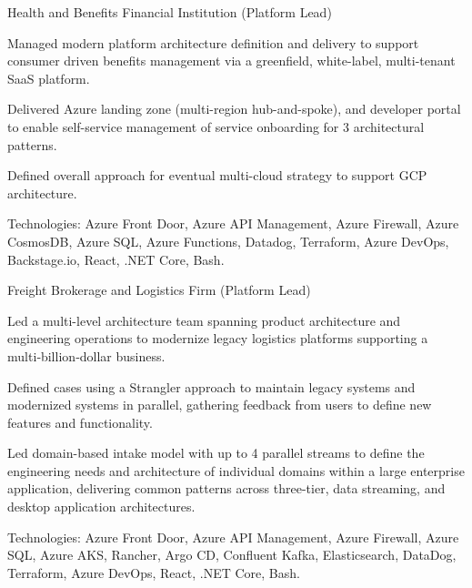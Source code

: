 \begin{cventries}
  \cventry
    {Health and Benefits Financial Institution (Platform Lead)} %
    {} %
    {} %
    {} %
    {
      \begin{cvitems} %
        \item {Managed modern platform architecture definition and delivery to support consumer driven benefits management via a greenfield, white-label, multi-tenant SaaS platform.}
        \item {Delivered Azure landing zone (multi-region hub-and-spoke), and developer portal to enable self-service management of service onboarding for 3 architectural patterns.}
        \item {Defined overall approach for eventual multi-cloud strategy to support GCP architecture.}
        \item {Technologies: Azure Front Door, Azure API Management, Azure Firewall, Azure CosmosDB, Azure SQL, Azure Functions, Datadog, Terraform, Azure DevOps, Backstage.io, React, .NET Core, Bash.}
      \end{cvitems}
    }

  \cventry
    {Freight Brokerage and Logistics Firm (Platform Lead)} %
    {} %
    {} %
    {} %
    {
      \begin{cvitems} %
        \item {Led a multi-level architecture team spanning product architecture and engineering operations to modernize legacy logistics platforms supporting a multi‑billion‑dollar business.}
        \item {Defined cases using a Strangler approach to maintain legacy systems and modernized systems in parallel, gathering feedback from users to define new features and functionality.}
        \item {Led domain-based intake model with up to 4 parallel streams to define the engineering needs and architecture of individual domains within a large enterprise application, delivering common patterns across three-tier, data streaming, and desktop application architectures.}
        \item {Technologies: Azure Front Door, Azure API Management, Azure Firewall, Azure SQL, Azure AKS, Rancher, Argo CD, Confluent Kafka, Elasticsearch, DataDog, Terraform, Azure DevOps, React, .NET Core, Bash.}
      \end{cvitems}
    }


\end{cventries}
